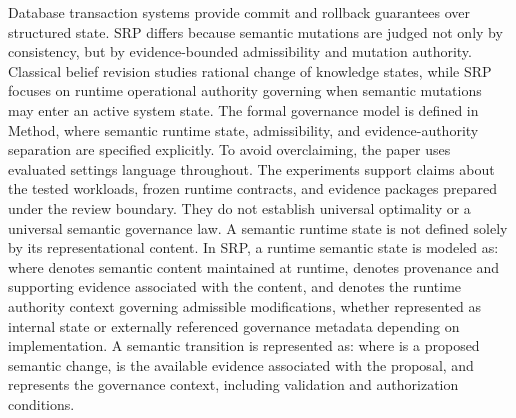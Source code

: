 {}Database transaction systems provide commit and rollback guarantees over structured state. SRP differs because semantic mutations are judged not only by consistency, but by evidence-bounded admissibility and mutation authority. Classical belief revision studies rational change of knowledge states, while SRP focuses on runtime operational authority governing when semantic mutations may enter an active system state.\markdownRendererParagraphSeparator
{}The formal governance model is defined in Method, where semantic runtime state, admissibility, and evidence-authority separation are specified explicitly.\markdownRendererInterblockSeparator
{}
\markdownRendererSectionEnd \markdownRendererSectionBegin
{}\markdownRendererInterblockSeparator
{}To avoid overclaiming, the paper uses evaluated settings language throughout. The experiments support claims about the tested workloads, frozen runtime contracts, and evidence packages prepared under the review boundary. They do not establish universal optimality or a universal semantic governance law.\markdownRendererInterblockSeparator
{}
\markdownRendererSectionEnd 
\markdownRendererSectionEnd \markdownRendererSectionBegin
{}\markdownRendererInterblockSeparator
{}\markdownRendererSectionBegin
{}\markdownRendererInterblockSeparator
{}A semantic runtime state is not defined solely by its representational content. In SRP, a runtime semantic state is modeled as:\markdownRendererInterblockSeparator
{}\markdownRendererInterblockSeparator
{}where  denotes semantic content maintained at runtime,  denotes provenance and supporting evidence associated with the content, and  denotes the runtime authority context governing admissible modifications, whether represented as internal state or externally referenced governance metadata depending on implementation.\markdownRendererParagraphSeparator
{}A semantic transition is represented as:\markdownRendererInterblockSeparator
{}\markdownRendererInterblockSeparator
{}where  is a proposed semantic change,  is the available evidence associated with the proposal, and  represents the governance context, including validation and authorization conditions.\markdownRendererParagraphSeparator
